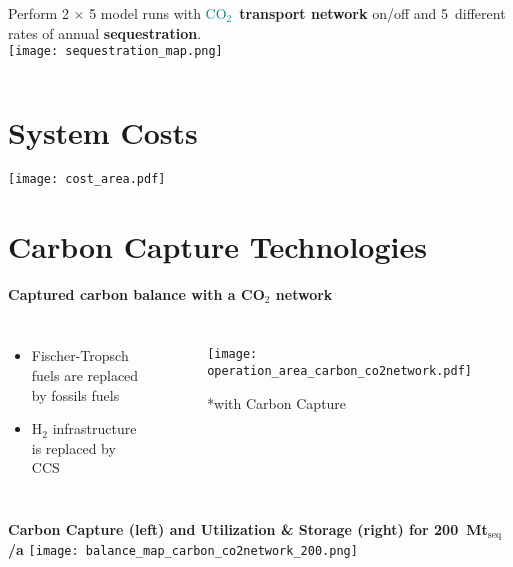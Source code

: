 \documentclass[12pt, aspectratio=169]{beamer}
\newcommand{\carbon}{\textcolor{teal}{CO$_2$}}
\newcommand{\hydrogen}{H$_2$}
\begin{document}
\begin{frame}[plain]
    \begin{columns}
        Perform 2 $\times$ 5 model runs with
        \carbon{}~\textbf{transport network} on/off and 5~different rates of annual \textbf{sequestration}.\\
        \texttt{[image: sequestration\_map.png]}
    \end{columns}
\end{frame}


\section*{System Costs}
\begin{frame}[plain]
    \texttt{[image: cost\_area.pdf]}
\end{frame}


\section*{Carbon Capture Technologies}
\begin{frame}
    \qquad \textbf{Captured carbon balance with a CO$_2$ network}
    \begin{columns}
        \begin{itemize}
            \item  Fischer-Tropsch fuels are replaced by fossils fuels
            \item \hydrogen{} infrastructure is replaced by CCS
        \end{itemize}
        \begin{figure}
            \texttt{[image: operation\_area\_carbon\_co2network.pdf]}
            \par\footnotesize{*with Carbon Capture}
        \end{figure}
    \end{columns}
\end{frame}


\begin{frame}
    \textbf{Carbon Capture (left) and Utilization \& Storage (right) for 200~Mt$_{\text{seq}}$/a}
    \texttt{[image: balance\_map\_carbon\_co2network\_200.png]}
\end{frame}
\end{document}
